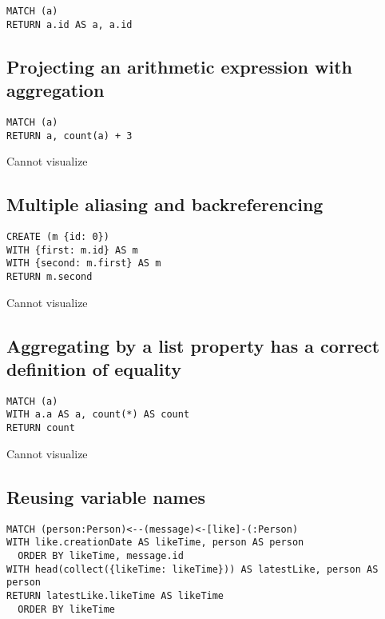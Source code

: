 \begin{lstlisting}
MATCH (a)
RETURN a.id AS a, a.id
\end{lstlisting}

\subsection{Projecting an arithmetic expression with aggregation}

\begin{lstlisting}
MATCH (a)
RETURN a, count(a) + 3
\end{lstlisting}

Cannot visualize
\subsection{Multiple aliasing and backreferencing}

\begin{lstlisting}
CREATE (m {id: 0})
WITH {first: m.id} AS m
WITH {second: m.first} AS m
RETURN m.second
\end{lstlisting}

Cannot visualize
\subsection{Aggregating by a list property has a correct definition of equality}

\begin{lstlisting}
MATCH (a)
WITH a.a AS a, count(*) AS count
RETURN count
\end{lstlisting}

Cannot visualize
\subsection{Reusing variable names}

\begin{lstlisting}
MATCH (person:Person)<--(message)<-[like]-(:Person)
WITH like.creationDate AS likeTime, person AS person
  ORDER BY likeTime, message.id
WITH head(collect({likeTime: likeTime})) AS latestLike, person AS person
RETURN latestLike.likeTime AS likeTime
  ORDER BY likeTime
\end{lstlisting}

